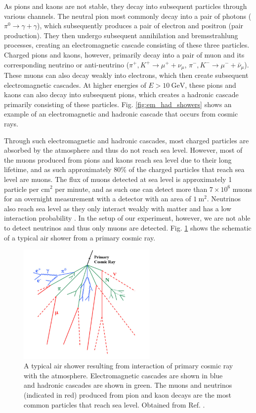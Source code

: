 \documentclass[a4paper]{report}
\numberwithin{equation}{section}
\begin{document}
As pions and kaons are not stable, they decay into subsequent particles through various channels.  
The neutral pion most commonly decay into a pair of photons ($\pi^0 \rightarrow \gamma + \gamma$), which subsequently produces a pair of electron and positron (pair production). They then undergo 
subsequent annihilation and bremsstrahlung processes, creating an electromagnetic cascade consisting of these three particles. Charged 
pions and kaons, however, primarily decay into a pair of muon and its corresponding neutrino or anti-neutrino ($\pi^+, K^+ \rightarrow \mu^+ + \nu_\mu$, $\pi^-, 
K^- \rightarrow \mu^- + \bar{\nu}_\mu$). These muons can also decay weakly into electrons, which then create subsequent electromagnetic cascades.
At higher energies of $E > \SI{10}{\giga\electronvolt}$, these pions and kaons can also decay into subsequent pions, which 
creates a hadronic cascade primarily consisting of these particles. Fig. \ref{fig:em_had_showers} shows an example of an electromagnetic and hadronic cascade that occurs from cosmic rays.


Through such electromagnetic and hadronic cascades, most charged particles are absorbed by the atmosphere and thus do not reach sea level. However, most of the muons 
produced from pions and kaons reach sea level due to their long lifetime, and as such approximately 80\% of the charged particles that reach sea level are muons.
The flux of muons detected at sea level is approximately 1 particle per cm$^2$ per minute, and as such one can detect more than $7 \times 10^{6}$ muons for an 
overnight measurement with a detector with an area of $\SI{1}{\meter\squared}$.  Neutrinos also reach sea level as they only interact weakly with matter and has a 
low interaction probability \cite{Grupen2005}. In the setup of our experiment, however, we are not able to detect neutrinos and thus only muons are detected. 
Fig. \ref{fig:air_shower} shows the schematic of a typical air shower from a primary cosmic ray. \par 


\begin{figure}[!h]
	\centering
	\includegraphics[width=0.6\textwidth]{air_shower.png}
	\caption{A typical air shower resulting from interaction of primary cosmic ray with the atmosphere. Electromagnetic cascades are shown in blue and hadronic 
	cascades are shown in green. The muons and neutrinos (indicated in red) produced from pion and kaon decays are the most common particles that reach sea level.
	Obtained from Ref. \cite{Blanco2009}.}
	\label{fig:air_shower}	
\end{figure}
\end{document}
